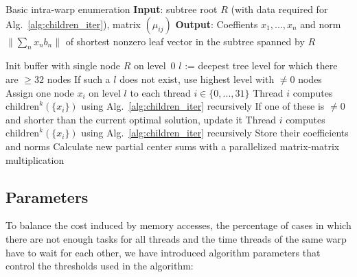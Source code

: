 \documentclass{scrartcl}
\begin{document}
    \begin{algorithm}
        \caption{
            Basic intra-warp enumeration\label{alg:warp_enum}
            \newline
            \textbf{Input}: subtree root $R$ (with data required for Alg.\ \ref{alg:children_iter}), matrix $(\mu_{ij})$
            \newline
            \textbf{Output}: Coeffients $x_1, ..., x_n$ and norm $\| \sum_n x_n b_n \|$ of shortest nonzero leaf vector in the subtree spanned by $R$
        }
        \begin{algorithmic}
            \STATE Init buffer with single node $R$ on level~0
                \STATE $l$ := deepest tree level for which there are $\geq 32$ nodes
                \STATE If such a $l$ does not exist, use highest level with $\neq 0$ nodes
                \STATE Assign one node $x_i$ on level $l$ to each thread $i \in \{0, ..., 31\}$
                    \STATE Thread $i$ computes $\mathrm{children}^k(\{x_i\})$ using Alg.\ \ref{alg:children_iter} recursively
                    \STATE If one of these is $\neq 0$ and shorter than the current optimal solution, update it
                \ELSE
                    \STATE Thread $i$ computes $\mathrm{children}^k(\{x_i\})$ using Alg.\ \ref{alg:children_iter} recursively
                    \STATE Store their coefficients and norms
                    \STATE Calculate new partial center sums with a parallelized matrix-matrix multiplication
                \ENDIF
                \ENDWHILE
        \end{algorithmic}
    \end{algorithm}

    \subsection{Parameters}
    
    To balance the cost induced by memory accesses, the percentage of cases in which there are not enough tasks for all threads and the time threads of the same warp have to wait for each other, we have introduced algorithm parameters that control the thresholds used in the algorithm:
    
\end{document}
